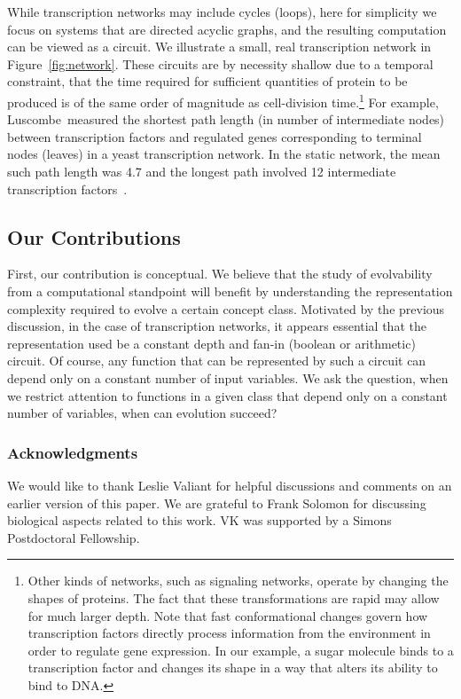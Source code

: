 \documentclass[11pt]{article}
\begin{document}
While transcription networks may include cycles (loops), here for simplicity we
focus on systems that are directed acyclic graphs, and the resulting computation
can be viewed as a circuit. We illustrate a small, real transcription network in
Figure~\ref{fig:network}. These circuits are by necessity shallow due to
a temporal constraint, that the time required for sufficient quantities of
protein to be produced is of the same order of magnitude as cell-division
time.\footnote{Other kinds of networks, such as signaling networks, operate by
changing the shapes of proteins. The fact that these transformations are rapid
may allow for much larger depth. Note that fast conformational changes govern
how transcription factors directly process information from the environment in
order to regulate gene expression.  In our example, a sugar molecule binds to a
transcription factor and changes its shape in a way that alters its ability to
bind to DNA.} For example, Luscombe~\etal measured the shortest path length (in
number of intermediate nodes) between transcription factors and regulated genes
corresponding to terminal nodes (leaves) in a yeast transcription network. In
the static network, the mean such path length was 4.7 and the longest path
involved 12 intermediate transcription factors~\cite{Luscombe:2004}.

\subsection*{Our Contributions}

First, our contribution is conceptual. We believe that the study of evolvability
from a computational standpoint will benefit by understanding the representation
complexity required to evolve a certain concept class. Motivated by the previous
discussion, in the case of transcription networks, it appears essential that the
representation used be a constant depth and fan-in (boolean or arithmetic)
circuit. Of course, any function that can be represented by such a circuit can
depend only on a constant number of input variables. We ask the
question, when we restrict attention to functions in a given class that depend
only on a constant number of variables, when can evolution succeed?


\subsubsection*{Acknowledgments} 
We would like to thank Leslie Valiant for helpful discussions and comments on an
earlier version of this paper. We are grateful to Frank Solomon for discussing
biological aspects related to this work. VK was supported by a Simons Postdoctoral Fellowship.
\end{document}
